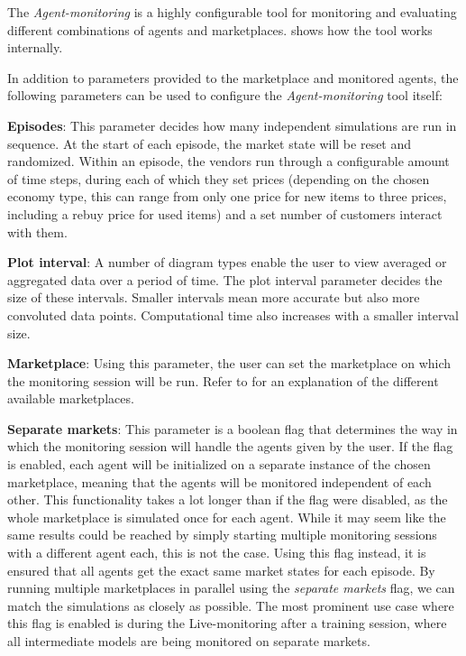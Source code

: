 The \emph{Agent-monitoring} is a highly configurable tool for monitoring and evaluating different combinations of agents and marketplaces.  shows how the tool works internally.

In addition to parameters provided to the marketplace and monitored agents, the following parameters can be used to configure the \emph{Agent-monitoring} tool itself:

\medskip
\noindent\textbf{Episodes}: This parameter decides how many independent simulations are run in sequence. At the start of each episode, the market state will be reset and randomized. Within an episode, the vendors run through a configurable amount of time steps, during each of which they set prices (depending on the chosen economy type, this can range from only one price for new items to three prices, including a rebuy price for used items) and a set number of customers interact with them.

\medskip
\noindent\textbf{Plot interval}: A number of diagram types enable the user to view averaged or aggregated data over a period of time. The plot interval parameter decides the size of these intervals. Smaller intervals mean more accurate but also more convoluted data points. Computational time also increases with a smaller interval size.

\medskip
\noindent\textbf{Marketplace}: Using this parameter, the user can set the marketplace on which the monitoring session will be run. Refer to  for an explanation of the different available marketplaces.

\medskip
\noindent\textbf{Separate markets}: This parameter is a boolean flag that determines the way in which the monitoring session will handle the agents given by the user. If the flag is enabled, each agent will be initialized on a separate instance of the chosen marketplace, meaning that the agents will be monitored independent of each other. This functionality takes a lot longer than if the flag were disabled, as the whole marketplace is simulated once for each agent. While it may seem like the same results could be reached by simply starting multiple monitoring sessions with a different agent each, this is not the case. Using this flag instead, it is ensured that all agents get the exact same market states for each episode. By running multiple marketplaces in parallel using the \emph{separate markets} flag, we can match the simulations as closely as possible. The most prominent use case where this flag is enabled is during the Live-monitoring after a training session, where all intermediate models are being monitored on separate markets.

